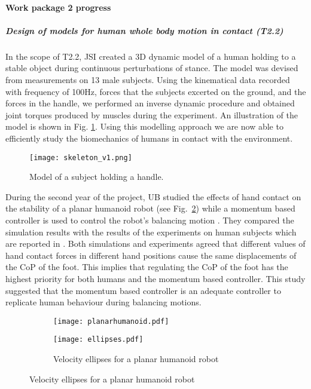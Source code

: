 \paragraph{Work package 2 progress}


\subparagraph{Design of models for human whole body motion in contact (T2.2)}
In the scope of T2.2, JSI created a 3D dynamic model of a human holding to a stable object during continuous perturbations of stance. The model was devised from measurements on 13 male subjects. Using the kinematical data recorded with frequency of 100Hz, forces that the subjects excerted on the ground, and the forces in the handle, we performed an inverse dynamic procedure and obtained joint torques produced by muscles during the experiment. An illustration of the model is shown in Fig. \ref{fig:skeleton}. Using this modelling approach we are now able to efficiently study the biomechanics of humans in contact with the environment.

\begin{figure}[!t]
	\begin{center}
		\texttt{[image: skeleton\_v1.png]}
		\caption{Model of a subject holding a handle.}
		\label{fig:skeleton}
	\end{center}
\end{figure}


During the second year of the project, UB studied the effects of hand contact
on the stability of a planar humanoid robot (see Fig.~\ref{planarhumanoid})
while a momentum based controller is used to control the robot's balancing
motion \cite{Azad2014}. They compared the simulation results with the
results of the experiments on human subjects which are reported in
\cite{Babic2014}. Both simulations and experiments agreed that different
values of hand contact forces in different hand positions cause the same
displacements of the CoP of the foot. This implies that regulating the CoP of
the foot has the highest priority for both humans and the momentum based
controller.  This study suggested that the momentum based controller is an
adequate controller to replicate human behaviour during balancing motions.

\begin{figure}[!t]
  \centering
	\begin{subfigure}[b]{0.45\textwidth}
	\centering
  	\texttt{[image: planarhumanoid.pdf]}
   \label{planarhumanoid}
	\end{subfigure}
	\begin{subfigure}[b]{0.45\textwidth}
	\centering
	\texttt{[image: ellipses.pdf]}
	\caption{Velocity ellipses for a planar humanoid robot}
	\label{ellipses}
	\end{subfigure}
\end{figure}


